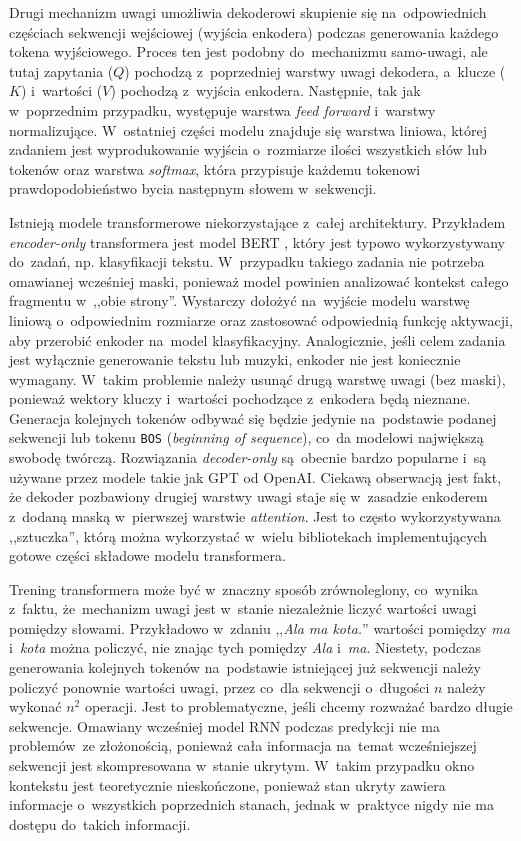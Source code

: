 \documentclass[data-science]{agh-wi} %
\begin{document}
Drugi mechanizm uwagi umożliwia dekoderowi skupienie się na~odpowiednich częściach sekwencji wejściowej (wyjścia enkodera) podczas generowania każdego tokena wyjściowego. Proces ten jest podobny do~mechanizmu samo-uwagi, ale tutaj zapytania ($Q$) pochodzą z~poprzedniej warstwy uwagi dekodera, a~klucze ($K$) i~wartości ($V$) pochodzą z~wyjścia enkodera. Następnie, tak jak w~poprzednim przypadku, występuje warstwa \textit{feed forward} i~warstwy normalizujące. W~ostatniej części modelu znajduje się warstwa liniowa, której zadaniem jest wyprodukowanie wyjścia o~rozmiarze ilości wszystkich słów lub tokenów oraz warstwa \textit{softmax}, która przypisuje każdemu tokenowi prawdopodobieństwo bycia następnym słowem w~sekwencji.

Istnieją modele transformerowe niekorzystające z~całej architektury. Przykładem \textit{encoder-only} transformera jest model BERT \cite{bert}, który jest typowo wykorzystywany do~zadań, np. klasyfikacji tekstu. W~przypadku takiego zadania nie potrzeba omawianej wcześniej maski, ponieważ model powinien analizować kontekst całego fragmentu w~,,obie strony''. Wystarczy dołożyć na~wyjście modelu warstwę liniową o~odpowiednim rozmiarze oraz zastosować odpowiednią funkcję aktywacji, aby przerobić enkoder na~model klasyfikacyjny.
Analogicznie, jeśli celem zadania jest wyłącznie generowanie tekstu lub muzyki, enkoder nie jest koniecznie wymagany. W~takim problemie należy usunąć drugą warstwę uwagi (bez maski), ponieważ wektory kluczy i~wartości pochodzące z~enkodera będą nieznane. Generacja kolejnych tokenów odbywać się będzie jedynie na~podstawie podanej sekwencji lub tokenu \texttt{BOS} (\textit{beginning of sequence}), co~da modelowi największą swobodę twórczą. Rozwiązania \textit{decoder-only} są~obecnie bardzo popularne i~są używane przez modele takie jak GPT od OpenAI. Ciekawą obserwacją jest fakt, że dekoder pozbawiony drugiej warstwy uwagi staje się w~zasadzie enkoderem z~dodaną maską w~pierwszej warstwie \textit{attention}. Jest to często wykorzystywana ,,sztuczka'', którą można wykorzystać w~wielu bibliotekach implementujących gotowe części składowe modelu transformera.

Trening transformera może być w~znaczny sposób zrównoleglony, co~wynika z~faktu, że~mechanizm uwagi jest w~stanie niezależnie liczyć wartości uwagi pomiędzy słowami. Przykładowo w~zdaniu ,,\textit{Ala ma kota.}'' wartości pomiędzy \textit{ma} i~\textit{kota} można policzyć, nie znając tych pomiędzy \textit{Ala} i~\textit{ma}. Niestety, podczas generowania kolejnych tokenów na~podstawie istniejącej już sekwencji należy policzyć ponownie wartości uwagi, przez co~dla sekwencji o~długości $n$ należy wykonać $n^2$ operacji. Jest to problematyczne, jeśli chcemy rozważać bardzo długie sekwencje. Omawiany wcześniej model RNN podczas predykcji nie ma problemów~ze złożonością, ponieważ cała informacja na~temat wcześniejszej sekwencji jest skompresowana w~stanie ukrytym. W~takim przypadku okno kontekstu jest teoretycznie nieskończone, ponieważ stan ukryty zawiera informacje o~wszystkich poprzednich stanach, jednak w~praktyce nigdy nie ma dostępu do~takich informacji.
\end{document}
